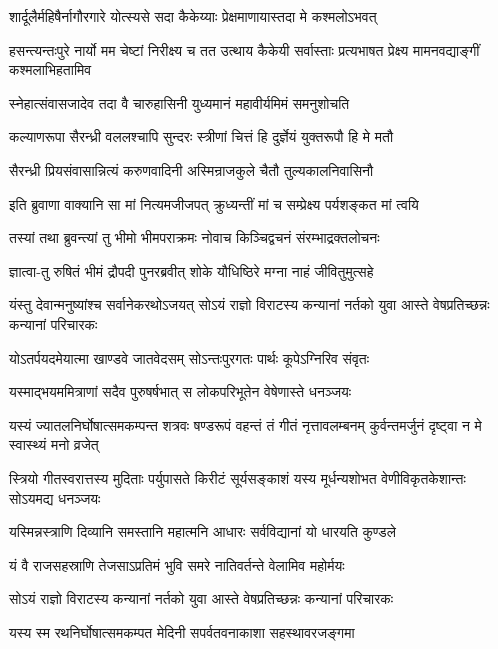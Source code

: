\twolineshloka
{शार्दूलैर्महिषैर्नागौरगारे योत्स्यसे सदा}
{कैकेय्याः प्रेक्षमाणायास्तदा मे कश्मलोऽभवत्}


\onelineshloka
{हसन्त्यन्तःपुरे नार्यो मम चेष्टां निरीक्ष्य च}
\twolineshloka
{तत उत्थाय कैकेयी सर्वास्ताः प्रत्यभाषत}
{प्रेक्ष्य मामनवद्याङ्गीं कश्मलाभिहतामिव}


\twolineshloka
{स्नेहात्संवासजादेव तदा वै चारुहासिनी}
{युध्यमानं महावीर्यमिमं समनुशोचति}


\twolineshloka
{कल्याणरूपा सैरन्ध्री वललश्चापि सुन्दरः}
{स्त्रीणां चित्तं हि दुर्ज्ञेयं युक्तरूपौ हि मे मतौ}


\twolineshloka
{सैरन्ध्री प्रियसंवासान्नित्यं करुणवादिनी}
{अस्मिन्राजकुले चैतौ तुल्यकालनिवासिनौ}


\twolineshloka
{इति ब्रुवाणा वाक्यानि सा मां नित्यमजीजपत्}
{क्रुध्यन्तीं मां च सम्प्रेक्ष्य पर्यशङ्कत मां त्वयि}


\twolineshloka
{तस्यां तथा ब्रुवन्त्यां तु भीमो भीमपराक्रमः}
{नोवाच किञ्चिद्वचनं संरम्भाद्रक्तलोचनः}


\twolineshloka
{ज्ञात्वा-तु रुषितं भीमं द्रौपदी पुनरब्रवीत्}
{शोके यौधिष्ठिरे मग्ना नाहं जीवितुमुत्सहे}


\threelineshloka
{यंस्तु देवान्मनुष्यांश्च सर्वानेकरथोऽजयत्}
{सोऽयं राज्ञो विराटस्य कन्यानां नर्तको युवा}
{आस्ते वेषप्रतिच्छन्नः कन्यानां परिचारकः}


\twolineshloka
{योऽतर्पयदमेयात्मा खाण्डवे जातवेदसम्}
{सोऽन्तःपुरगतः पार्थः कूपेऽग्निरिव संवृतः}


\twolineshloka
{यस्माद्भयममित्राणां सदैव पुरुषर्षभात्}
{स लोकपरिभूतेन वेषेणास्ते धनञ्जयः}


\threelineshloka
{यस्यं ज्यातलनिर्घोषात्समकम्पन्त शत्रवः}
{षण्डरूपं वहन्तं तं गीतं नृत्तावलम्बनम्}
{कुर्वन्तमर्जुनं दृष्ट्वा न मे स्वास्थ्यं मनो व्रजेत्}


\onelineshloka
{स्त्रियो गीतस्वरात्तस्य मुदिताः पर्युपासते}
\twolineshloka
{किरीटं सूर्यसङ्काशं यस्य मूर्धन्यशोभत}
{वेणीविकृतकेशान्तः सोऽयमद्य धनञ्जयः}


\twolineshloka
{यस्मिन्नस्त्राणि दिव्यानि समस्तानि महात्मनि}
{आधारः सर्वविद्यानां यो धारयति कुण्डले}


\twolineshloka
{यं वै राजसहस्राणि तेजसाऽप्रतिमं भुवि}
{समरे नातिवर्तन्ते वेलामिव महोर्मयः}


\twolineshloka
{सोऽयं राज्ञो विराटस्य कन्यानां नर्तको युवा}
{आस्ते वेषप्रतिच्छन्नः कन्यानां परिचारकः}


\twolineshloka
{यस्य स्म रथनिर्घोषात्समकम्पत मेदिनी}
{सपर्वतवनाकाशा सहस्थावरजङ्गमा}


